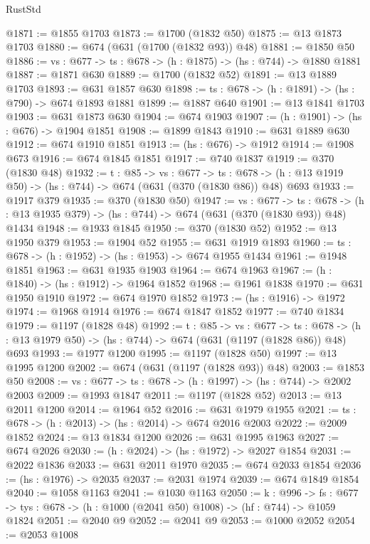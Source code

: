 \begin{lexlean}{RustStd}
\begin{coremodule}
@1871 := @1855 @1703
@1873 := @1700 (@1832 @50)
@1875 := @13 @1873 @1703
@1880 := @674 (@631 (@1700 (@1832 @93)) @48)
@1881 := @1850 @50
@1886 := {vs : @677} -> {ts : @678} -> (h : @1875) -> (hs : @744) -> @1880 @1881
@1887 := @1871 @630
@1889 := @1700 (@1832 @52)
@1891 := @13 @1889 @1703
@1893 := @631 @1857 @630
@1898 := {ts : @678} -> (h : @1891) -> (hs : @790) -> @674 @1893 @1881
@1899 := @1887 @640
@1901 := @13 @1841 @1703
@1903 := @631 @1873 @630
@1904 := @674 @1903
@1907 := (h : @1901) -> (hs : @676) -> @1904 @1851
@1908 := @1899 @1843
@1910 := @631 @1889 @630
@1912 := @674 @1910 @1851
@1913 := (hs : @676) -> @1912
@1914 := @1908 @673
@1916 := @674 @1845 @1851
@1917 := @740 @1837
@1919 := @370 (@1830 @48)
@1932 := {t : @85} ->
  {vs : @677} ->
  {ts : @678} -> (h : @13 @1919 @50) -> (hs : @744) -> @674 (@631 (@370 (@1830 @86)) @48) @693
@1933 := @1917 @379
@1935 := @370 (@1830 @50)
@1947 := {vs : @677} ->
  {ts : @678} -> (h : @13 @1935 @379) -> (hs : @744) -> @674 (@631 (@370 (@1830 @93)) @48) @1434
@1948 := @1933 @1845
@1950 := @370 (@1830 @52)
@1952 := @13 @1950 @379
@1953 := @1904 @52
@1955 := @631 @1919 @1893
@1960 := {ts : @678} -> (h : @1952) -> (hs : @1953) -> @674 @1955 @1434
@1961 := @1948 @1851
@1963 := @631 @1935 @1903
@1964 := @674 @1963
@1967 := (h : @1840) -> (hs : @1912) -> @1964 @1852
@1968 := @1961 @1838
@1970 := @631 @1950 @1910
@1972 := @674 @1970 @1852
@1973 := (hs : @1916) -> @1972
@1974 := @1968 @1914
@1976 := @674 @1847 @1852
@1977 := @740 @1834
@1979 := @1197 (@1828 @48)
@1992 := {t : @85} ->
  {vs : @677} ->
  {ts : @678} -> (h : @13 @1979 @50) -> (hs : @744) -> @674 (@631 (@1197 (@1828 @86)) @48) @693
@1993 := @1977 @1200
@1995 := @1197 (@1828 @50)
@1997 := @13 @1995 @1200
@2002 := @674 (@631 (@1197 (@1828 @93)) @48)
@2003 := @1853 @50
@2008 := {vs : @677} -> {ts : @678} -> (h : @1997) -> (hs : @744) -> @2002 @2003
@2009 := @1993 @1847
@2011 := @1197 (@1828 @52)
@2013 := @13 @2011 @1200
@2014 := @1964 @52
@2016 := @631 @1979 @1955
@2021 := {ts : @678} -> (h : @2013) -> (hs : @2014) -> @674 @2016 @2003
@2022 := @2009 @1852
@2024 := @13 @1834 @1200
@2026 := @631 @1995 @1963
@2027 := @674 @2026
@2030 := (h : @2024) -> (hs : @1972) -> @2027 @1854
@2031 := @2022 @1836
@2033 := @631 @2011 @1970
@2035 := @674 @2033 @1854
@2036 := (hs : @1976) -> @2035
@2037 := @2031 @1974
@2039 := @674 @1849 @1854
@2040 := @1058 @1163
@2041 := @1030 @1163
@2050 := {k : @996} ->
  {fs : @677} -> {tys : @678} -> (h : @1000 (@2041 @50) @1008) -> (hf : @744) -> @1059 @1824
@2051 := @2040 @9
@2052 := @2041 @9
@2053 := @1000 @2052
@2054 := @2053 @1008

\end{coremodule}
\end{lexlean}
